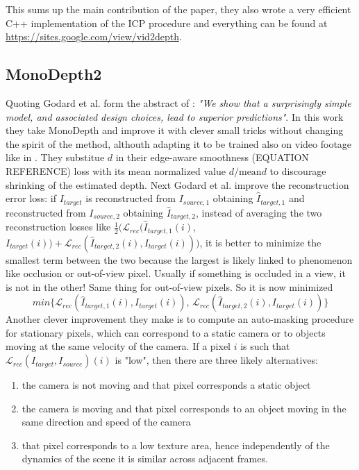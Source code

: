 This sums up the main contribution of the paper, they also wrote a very efficient C++ implementation of the ICP procedure and everything can be found at \url{https://sites.google.com/view/vid2depth}.

\subsection{MonoDepth2}
Quoting Godard et al. form the abstract of \cite{MonoDepth2}: \textit{"We show that a surprisingly simple model, and associated design choices, lead to superior predictions"}. In this work they take MonoDepth and improve it with clever small tricks without changing the spirit of the method, althouth adapting it to be trained also on video footage like in \cite{SfMLearner}. They substitue $d$ in their edge-aware smoothness (EQUATION REFERENCE) loss with its mean normalized value $d / \text{mean} d$ to discourage shrinking of the estimated depth. Next Godard et al. improve the reconstruction error loss: if $I_{target}$ is reconstructed from $I_{source, 1}$ obtaining $\hat{I}_{target, 1}$ and reconstructed from $I_{source, 2}$ obtaining $\hat{I}_{target, 2}$, instead of averaging the two reconstruction losses like $\frac{1}{2}(\mathcal{L}_{rec}(\hat{I}_{target, 1}(i)$, $I_{target}(i)) + \mathcal{L}_{rec}(\hat{I}_{target, 2}(i), I_{target}(i)))$, it is better to minimize the smallest term between the two because the largest is likely linked to phenomenon like occlusion or out-of-view pixel. Usually if something is occluded in a view, it is not in the other! Same thing for out-of-view pixels. So it is now minimized
\[
	min \{ \mathcal{L}_{rec}(\hat{I}_{target, 1}(i), I_{target}(i)), \, \mathcal{L}_{rec}(\hat{I}_{target, 2}(i), I_{target}(i)) \}
\]
Another clever improvement they make is to compute an auto-masking procedure for stationary pixels, which can correspond to a static camera or to objects moving at the same velocity of the camera. If a pixel $i$ is such that $\mathcal{L}_{rec}(I_{target}, I_{source})(i)$ is "low", then there are three likely alternatives:
\begin{enumerate}
\item the camera is not moving and that pixel corresponds a static object
\item the camera is moving and that pixel corresponds to an object moving in the same direction and speed of the camera
\item that pixel corresponds to a low texture area, hence independently of the dynamics of the scene it is similar across adjacent frames.
\end{enumerate}
